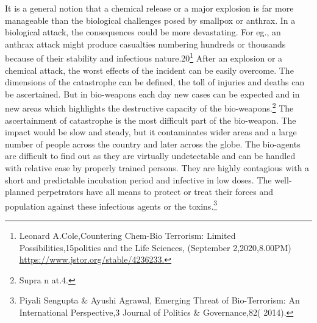 \begin{multicols}{2}
\noi
It is a general notion that a chemical release or a major explosion is far more manageable
than the biological challenges posed by smallpox or anthrax. In a biological attack, the
consequences could be more devastating. For eg., an anthrax attack might produce casualties
numbering hundreds or thousands because of their stability and infectious nature.20\footnote{Leonard A.Cole,Countering Chem-Bio Terrorism: Limited Possibilities,15politics and the Life Sciences,
(September 2,2020,8.00PM) \url{https://www.jstor.org/stable/4236233.}} After an
explosion or a chemical attack, the worst effects of the incident can be easily overcome. The
dimensions of the catastrophe can be defined, the toll of injuries and deaths can be
ascertained. But in bio-weapons each day new cases can be expected and in new areas which 
highlights the destructive capacity of the bio-weapons.\footnote{Supra n at.4.} The ascertainment of catastrophe is
the most difficult part of the bio-weapon. The impact would be slow and steady, but it
contaminates wider areas and a large number of people across the country and later across the
globe. The bio-agents are difficult to find out as they are virtually undetectable and can be
handled with relative ease by properly trained persons. They are highly contagious with a
short and predictable incubation period and infective in low doses. The well-planned
perpetrators have all means to protect or treat their forces and population against these
infectious agents or the toxins.\footnote{Piyali Sengupta \& Ayushi Agrawal, Emerging Threat of Bio-Terrorism: An International Perspective,3 Journal of Politics \& Governance,82( 2014).}



\end{multicols}
